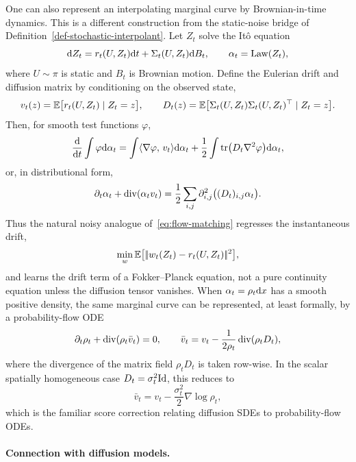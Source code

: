 \begin{rem}\label{rem-noisy-stochastic-interpolants}
One can also represent an interpolating marginal curve by Brownian-in-time dynamics. This is a different construction from the static-noise bridge of Definition~\ref{def-stochastic-interpolant}. Let $Z_t$ solve the It\^o equation
\[
    \mathrm{d} Z_t = r_t(U,Z_t)\mathrm{d} t + \Sigma_t(U,Z_t)\mathrm{d} B_t,
    \qquad \alpha_t=\operatorname{Law}(Z_t),
\]
where $U\sim\pi$ is static and $B_t$ is Brownian motion. Define the Eulerian drift and diffusion matrix by conditioning on the observed state,
\[
    v_t(z)=\mathbb{E}\bigl[r_t(U,Z_t)\mid Z_t=z\bigr],
    \qquad
    D_t(z)=\mathbb{E}\bigl[\Sigma_t(U,Z_t)\Sigma_t(U,Z_t)^\top\mid Z_t=z\bigr].
\]
Then, for smooth test functions $\varphi$,
\[
    \frac{\mathrm{d}}{\mathrm{d} t}\int \varphi\mathrm{d}\alpha_t
    = \int \langle \nabla\varphi,\,v_t\rangle\mathrm{d}\alpha_t
      + \frac12\int \operatorname{tr}\bigl(D_t\nabla^2\varphi\bigr)\mathrm{d}\alpha_t,
\]
or, in distributional form,
\begin{equation}\label{eq:noisy-interpolant-fokker-planck}
    \partial_t\alpha_t + \operatorname{div}(\alpha_t v_t)
    = \frac12\sum_{i,j}\partial_{i,j}^2\bigl((D_t)_{i,j}\alpha_t\bigr).
\end{equation}
Thus the natural noisy analogue of~\eqref{eq:flow-matching} regresses the instantaneous drift,
\[
    \min_w \mathbb{E}\bigl[|\!| w_t(Z_t)-r_t(U,Z_t) |\!|^2\bigr],
\]
and learns the drift term of a Fokker--Planck equation, not a pure continuity equation unless the diffusion tensor vanishes. When $\alpha_t=\rho_t\mathrm{d} x$ has a smooth positive density, the same marginal curve can be represented, at least formally, by a probability-flow ODE
\[
    \partial_t\rho_t+\operatorname{div}(\rho_t\bar v_t)=0,
    \qquad
    \bar v_t
    = v_t - \frac{1}{2\rho_t}\operatorname{div}(\rho_t D_t),
\]
where the divergence of the matrix field $\rho_tD_t$ is taken row-wise. In the scalar spatially homogeneous case $D_t=\sigma_t^2\mathrm{Id}$, this reduces to
\[
    \bar v_t = v_t - \frac{\sigma_t^2}{2}\nabla\log\rho_t,
\]
which is the familiar score correction relating diffusion SDEs to probability-flow ODEs.
\end{rem}

\paragraph{Connection with diffusion models.}\label{par-diffusion-model-connection}

